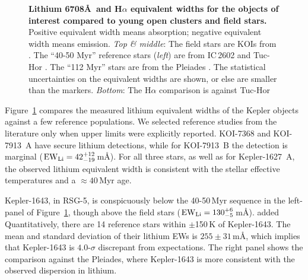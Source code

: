 \documentclass[12pt,twocolumn,tighten,linenumbers,trackchanges]{aastex63}
\begin{document}
\begin{figure}[tp]
\begin{center}
		\vspace{-0.35cm}
	\end{center}
	\vspace{-0.6cm}
	\caption{
    {\bf Lithium 6708\AA\ and H$\alpha$ equivalent widths for the
    objects of interest compared to young open clusters and field
    stars. } Positive equivalent width means absorption; negative
    equivalent width means emission.  
    {\it Top \& middle}:
    The field stars are KOIs from
    \citet{berger_identifying_2018}.  The ``40-50 Myr'' reference
    stars ({\it left}) are from IC\,2602  and
    Tuc-Hor \citep{kraus_stellar_2014}.  The ``112 Myr'' stars
    are from the Pleiades
    \citep{soderblom_evolution_1993,jones_evolution_1996,bouvier_pleiades_lirot_2018}.
    The statistical uncertainties on
    the equivalent widths are shown, or else are
    smaller than the markers.
    {\it Bottom}:
    The H$\alpha$ comparison is against Tuc-Hor
    \citep[$\approx$$40$\,Myr;][]{kraus_stellar_2014}
    \label{fig:lithium}
	}
\end{figure}

Figure~\ref{fig:lithium} compares the measured lithium equivalent
widths of the Kepler objects against a few reference populations.  We
selected reference studies from the literature only when upper limits were
explicitly reported.  KOI-7368 and KOI-7913~A have secure lithium
detections, while for KOI-7913~B the detection is marginal (${\rm EW}_{\rm
Li} = 42^{+12}_{-19}$\,m\AA).  For all three stars, as well as for
Kepler-1627~A, the observed lithium equivalent width is consistent
with the stellar effective temperatures and a $\approx40$\,Myr age.

Kepler-1643, in RSG-5, is conspicuously below the 40-50$\,$Myr
sequence in the left-panel of Figure~\ref{fig:lithium}, though
above the field stars (${\rm EW}_{\rm Li} = 130^{+6}_{-5}$\,m\AA).
added{
Quantitatively, there are 14 reference stars within $\pm$150\,K of Kepler-1643.
The mean and standard deviation of their lithium EWs is $255 \pm 31$\,m\AA,
which implies that Kepler-1643 is $4.0$-$\sigma$ discrepant from expectations.
}
The right panel shows the comparison against the Pleiades, where
Kepler-1643 is more consistent with the observed dispersion in
lithium.
\end{document}
